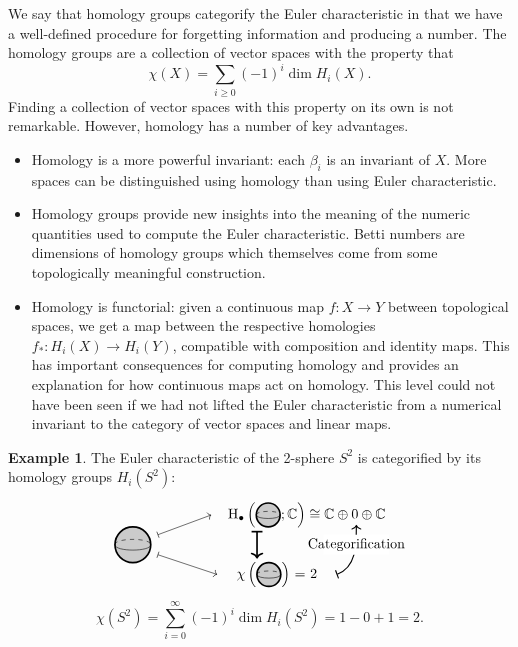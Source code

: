 \documentclass[a4paper,onecolumn,unpublished]{quantumarticle}
\theoremstyle{plain}
\theoremstyle{definition}
\newtheorem{example}[theorem]{Example}
\theoremstyle{definition}
\numberwithin{equation}{section}
\renewcommand{\to}{\rightarrow}
\newcommand{\sphere}[1][1]{
\xy
(0,0)*{
\begin{tikzpicture} [fill opacity=0.2, scale=#1]
	\path [fill=black] (0,0) circle (1);
	\draw (-1,0) .. controls (-1,-.4) and (1,-.4) .. (1,0);
	\draw[dashed] (-1,0) .. controls (-1,.4) and (1,.4) .. (1,0);
	\draw[very thick] (0,0) circle (1);
\end{tikzpicture}};
\endxy}
\begin{document}
We say that homology groups categorify the Euler characteristic in that we have a well-defined procedure for forgetting information and producing a number.  The homology groups are a collection of vector spaces with the property that
\[
 \chi(X) = \sum_{i \geq 0} (-1)^i \dim H_i(X). 
\]
Finding a collection of vector spaces with this property on its own is not remarkable.  However, homology has a number of key advantages.  
\begin{itemize}
\item Homology is a more powerful invariant:  each $\beta_i$ is an invariant of $X$.  More spaces can be distinguished using homology than using Euler characteristic.    
\item Homology groups provide new insights into the meaning of the numeric quantities used to compute the Euler characteristic.  Betti numbers are dimensions of homology groups which themselves come from some topologically meaningful construction.  
\item Homology is functorial: given a continuous map $f:X\to Y$ between topological spaces, we get a map between the respective homologies $f_*:H_i(X)\to H_i(Y)$, compatible with composition and identity maps. This has important consequences for computing homology and provides an explanation for how continuous maps act on homology. This level could not have been seen if we had not lifted the Euler characteristic from a numerical invariant to the category of vector spaces and linear maps.
\end{itemize}

\begin{example}
The Euler characteristic of the 2-sphere $S^2$ is categorified by its homology groups $H_i(S^2)$:
\[
\xy
(0,0)*{
\begin{tikzpicture}[scale=.5]
\node at (.75,0) {$\begin{tikzpicture} [fill opacity=0.2, scale=.45]
	\path [fill=black] (0,0) circle (1);
	\draw (-1,0) .. controls (-1,-.4) and (1,-.4) .. (1,0);
	\draw[dashed] (-1,0) .. controls (-1,.4) and (1,.4) .. (1,0);
	\draw[very thick] (0,0) circle (1);
	\end{tikzpicture}$};
\draw[|->] (2,.5) to (4.7,1.5);
\draw[|->] (2,-.5) to (5,-1.5);
\draw[|->, very thick] (7,.7) to (7,-.7);
\node at (9.5,1.5) {$\mathrm{H}_{\bullet}\left(\sphere[.3];\mathbb C\right) \cong \mathbb C \oplus 0 \oplus \mathbb C$};
\node at (8,-1.5) {$\chi\left(\sphere[.3]\right)$ = 2};
\draw[thick, |->] (11,-1.5) to [out=20,in=-90] (12,1);
  \path [fill=white] (10.35,-.5) rectangle (13.65,.5);
\node at (12,0) {$\text{Categorification}$};
\end{tikzpicture}};
\endxy
\]
\[\chi(S^2) = \sum_{i=0}^{\infty} (-1)^i \dim H_i(S^2) = 1 - 0 +1 =2.\]
\end{example}
  
\end{document}
